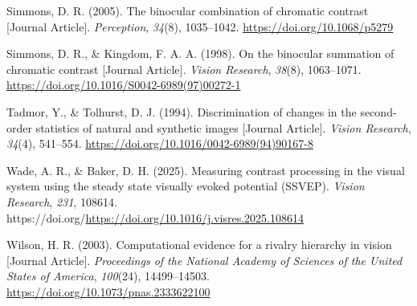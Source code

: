 \documentclass[
  12pt,
]{article}
\newlength{\cslhangindent}
\newenvironment{CSLReferences}[2] %
 {\begin{list}{}{%
  \setlength{\itemindent}{0pt}
  \setlength{\leftmargin}{0pt}
  \setlength{\parsep}{0pt}
  \ifodd #1
   \setlength{\leftmargin}{\cslhangindent}
   \setlength{\itemindent}{-1\cslhangindent}
  \fi
  \setlength{\itemsep}{#2\baselineskip}}}
 {\end{list}}
\begin{document}
\begin{CSLReferences}{1}{0}
Simmons, D. R. (2005). The binocular combination of chromatic contrast
{[}Journal Article{]}. \emph{Perception}, \emph{34}(8), 1035--1042.
\url{https://doi.org/10.1068/p5279}

Simmons, D. R., \& Kingdom, F. A. A. (1998). On the binocular summation
of chromatic contrast {[}Journal Article{]}. \emph{Vision Research},
\emph{38}(8), 1063--1071.
\url{https://doi.org/10.1016/S0042-6989(97)00272-1}

Tadmor, Y., \& Tolhurst, D. J. (1994). Discrimination of changes in the
second-order statistics of natural and synthetic images {[}Journal
Article{]}. \emph{Vision Research}, \emph{34}(4), 541--554.
\url{https://doi.org/10.1016/0042-6989(94)90167-8}

Wade, A. R., \& Baker, D. H. (2025). Measuring contrast processing in
the visual system using the steady state visually evoked potential
(SSVEP). \emph{Vision Research}, \emph{231}, 108614.
https://doi.org/\url{https://doi.org/10.1016/j.visres.2025.108614}

Wilson, H. R. (2003). Computational evidence for a rivalry hierarchy in
vision {[}Journal Article{]}. \emph{Proceedings of the National Academy
of Sciences of the United States of America}, \emph{100}(24),
14499--14503. \url{https://doi.org/10.1073/pnas.2333622100}

\end{CSLReferences}
\end{document}
